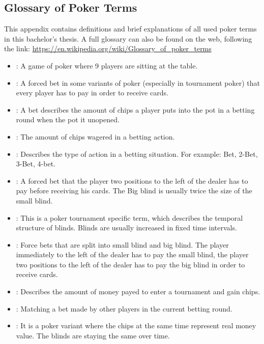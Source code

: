 \begin{appendices}
\chapter{Glossary of Poker Terms}
This appendix contains definitions and brief explanations of all used poker terms in this bachelor's thesis. A full glossary can also be found on the web, following the link: \href{https://en.wikipedia.org/wiki/Glossary_of_poker_terms}{https://en.wikipedia.org/wiki/Glossary\_of\_poker\_terms}
\begin{itemize}
\item {}:
A game of poker where 9 players are sitting at the table.
\item {}:
A forced bet in some variants of poker (especially in tournament poker) that every player has to pay in order to receive cards.
\item {}:
A bet describes the amount of chips a player puts into the pot in a betting round when the pot it unopened.
\item {}:
The amount of chips wagered in a betting action.
\item {}:
Describes the type of action in a betting situation. For example: Bet, 2-Bet, 3-Bet, 4-bet.
\item {}:
A forced bet that the player two positions to the left of the dealer has to pay before receiving his cards. The Big blind is usually twice the size of the small blind.
\item {}:
This is a poker tournament specific term, which describes the temporal structure of blinds. Blinds are usually increased in fixed time intervals.
\item {}:
Force bets that are split into small blind and big blind. The player immediately to the left of the dealer has to pay the small blind, the player two positions to the left of the dealer has to pay the big blind in order to receive cards.
\item {}:
Describes the amount of money payed to enter a tournament and gain chips.
\item {}:
Matching a bet made by other players in the current betting round.
\item {}: It is a poker variant where the chips at the same time represent real money value. The blinds are staying the same over time.

\end{itemize}
\end{appendices}
